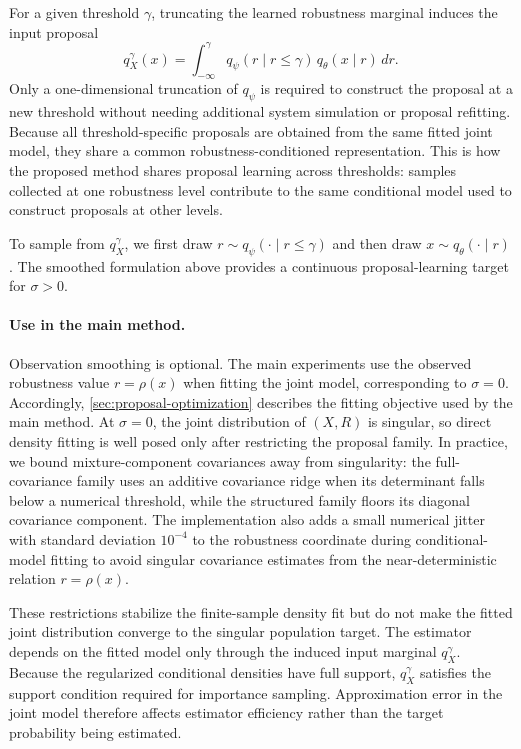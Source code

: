 \documentclass[twoside,11pt]{article}
\begin{document}
For a given threshold $\gamma$, truncating the learned robustness marginal induces the input proposal
\begin{equation*}
    q_X^\gamma(x)
    =
    \int_{-\infty}^{\gamma}
    q_{\psi}(r\mid r\leq\gamma)\,
    q_{\theta}(x\mid r)\,dr.
\end{equation*}
Only a one-dimensional truncation of $q_{\psi}$ is required to construct the proposal at a new threshold without needing additional system simulation or proposal refitting. Because all threshold-specific proposals are obtained from the same fitted joint model, they share a common robustness-conditioned representation. This is how the proposed method shares proposal learning across thresholds: samples collected at one robustness level contribute to the same conditional model used to construct proposals at other levels.

To sample from $q_X^\gamma$, we first draw $r\sim q_{\psi}(\cdot\mid r\leq\gamma)$ and then draw $x\sim q_{\theta}(\cdot\mid r)$. The smoothed formulation above provides a continuous proposal-learning target for $\sigma>0$.

\paragraph{Use in the main method.}
Observation smoothing is optional. The main experiments use the observed robustness value $r=\rho(x)$ when fitting the joint model, corresponding to $\sigma=0$. Accordingly, \cref{sec:proposal-optimization} describes the fitting objective used by the main method. At \(\sigma=0\), the joint distribution of \((X,R)\) is singular, so direct density fitting is well posed only after restricting the proposal family. In practice, we bound mixture-component covariances away from singularity: the full-covariance family uses an additive covariance ridge when its determinant falls below a numerical threshold, while the structured family floors its diagonal covariance component. The implementation also adds a small numerical jitter with standard deviation \(10^{-4}\) to the robustness coordinate during conditional-model fitting to avoid singular covariance estimates from the near-deterministic relation \(r=\rho(x)\).

These restrictions stabilize the finite-sample density fit but do not make the fitted joint distribution converge to the singular population target. The estimator depends on the fitted model only through the induced input marginal $q_X^\gamma$. Because the regularized conditional densities have full support, $q_X^\gamma$ satisfies the support condition required for importance sampling. Approximation error in the joint model therefore affects estimator efficiency rather than the target probability being estimated.
\end{document}
